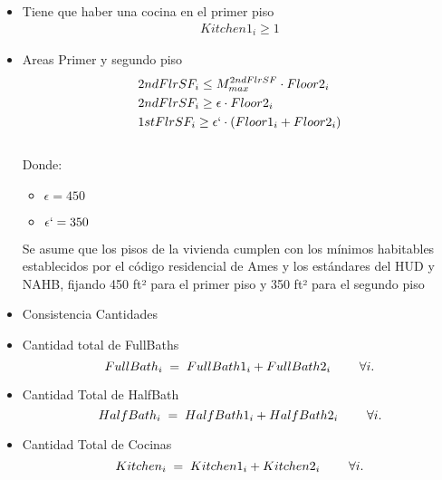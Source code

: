 \begin{itemize}
    \item{Tiene que haber una cocina en el primer piso}
\begin{align}
    Kitchen1_{i}\geq 1
\end{align}

    \item {Areas Primer y segundo piso}
\begin{align}
    &2ndFlrSF_{i}\leq M_{max}^{2ndFlrSF} \cdot Floor2_{i}\\
    &2ndFlrSF_{i}\geq \epsilon \cdot Floor2_{i}\\
    &1stFlrSF_{i}\geq \epsilon ` \cdot (Floor1_{i}+Floor2_{i})
\end{align}\\
Donde:
    \begin{itemize}
        \item $\epsilon=450$
        \item $\epsilon `=350$
\end{itemize}
Se asume que los pisos de la vivienda cumplen con los mínimos habitables establecidos por el código residencial de Ames y los estándares del HUD y NAHB, fijando 450 ft² para el primer piso  \cite{decock2011} y 350 ft² para el segundo piso\cite{ HUD2022}\cite{NAHB2023}
    \item{Consistencia Cantidades}
    \item {Cantidad total de FullBaths}
    \[
FullBath_i \;=\; FullBath1_i + FullBath2_i \hspace{8mm} \forall i.
\]
    \item {Cantidad Total de HalfBath}
    \[
HalfBath_i \;=\; HalfBath1_i + HalfBath2_i \hspace{8mm} \forall i.
\]

    \item{Cantidad Total de Cocinas}
\[
Kitchen_i \;=\; Kitchen1_i + Kitchen2_i \hspace{8mm} \forall i.
\]


\end{itemize}

